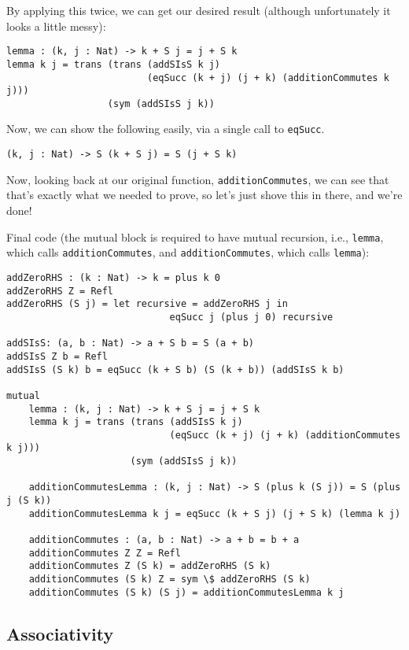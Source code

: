 \documentclass{article}
\newcommand{\inline}[1]{\texttt{#1}}
\begin{document}
By applying this twice, we can get our desired result (although unfortunately it looks a little messy):

\begin{verbatim}
lemma : (k, j : Nat) -> k + S j = j + S k
lemma k j = trans (trans (addSIsS k j)
                         (eqSucc (k + j) (j + k) (additionCommutes k j)))
                  (sym (addSIsS j k))
\end{verbatim}

Now, we can show the following easily, via a single call to \inline{eqSucc}.

\begin{verbatim}
(k, j : Nat) -> S (k + S j) = S (j + S k)
\end{verbatim}

Now, looking back at our original function, \inline{additionCommutes}, we can see that that’s exactly what we needed to prove, so let’s just shove this in there, and we’re done!

Final code (the mutual block is required to have mutual recursion, i.e., \inline{lemma}, which calls \inline{additionCommutes}, and \inline{additionCommutes}, which calls \inline{lemma}):

\begin{verbatim}
addZeroRHS : (k : Nat) -> k = plus k 0
addZeroRHS Z = Refl
addZeroRHS (S j) = let recursive = addZeroRHS j in
                             eqSucc j (plus j 0) recursive

addSIsS: (a, b : Nat) -> a + S b = S (a + b)
addSIsS Z b = Refl
addSIsS (S k) b = eqSucc (k + S b) (S (k + b)) (addSIsS k b)

mutual
    lemma : (k, j : Nat) -> k + S j = j + S k
    lemma k j = trans (trans (addSIsS k j)
                             (eqSucc (k + j) (j + k) (additionCommutes k j)))
                      (sym (addSIsS j k))

    additionCommutesLemma : (k, j : Nat) -> S (plus k (S j)) = S (plus j (S k))
    additionCommutesLemma k j = eqSucc (k + S j) (j + S k) (lemma k j)

    additionCommutes : (a, b : Nat) -> a + b = b + a
    additionCommutes Z Z = Refl
    additionCommutes Z (S k) = addZeroRHS (S k)
    additionCommutes (S k) Z = sym \$ addZeroRHS (S k)
    additionCommutes (S k) (S j) = additionCommutesLemma k j
\end{verbatim}

\subsection{Associativity}
\end{document}
